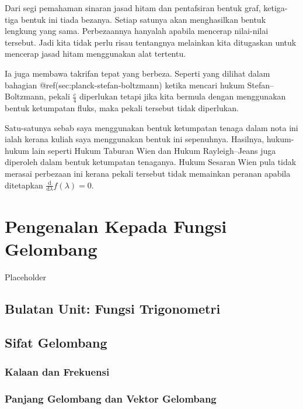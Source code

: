 \documentclass[
]{book}
\begin{document}
Dari segi pemahaman sinaran jasad hitam dan pentafsiran bentuk graf,
ketiga-tiga bentuk ini tiada bezanya. Setiap satunya akan menghasilkan
bentuk lengkung yang sama. Perbezaannya hanyalah apabila mencerap
nilai-nilai tersebut. Jadi kita tidak perlu risau tentangnya melainkan
kita ditugaskan untuk mencerap jasad hitam menggunakan alat tertentu.

Ia juga membawa takrifan tepat yang berbeza. Seperti yang dilihat dalam
bahagian @ref(sec:planck-stefan-boltzmann) ketika mencari hukum
Stefan--Boltzmann, pekali \(\frac{c}{4}\) diperlukan tetapi jika kita
bermula dengan menggunakan bentuk ketumpatan fluks, maka pekali tersebut
tidak diperlukan.

Satu-satunya sebab saya menggunakan bentuk ketumpatan tenaga dalam nota
ini ialah kerana kuliah saya menggunakan bentuk ini sepenuhnya.
Hasilnya, hukum-hukum lain seperti Hukum Taburan Wien dan Hukum
Rayleigh--Jeans juga diperoleh dalam bentuk ketumpatan tenaganya. Hukum
Sesaran Wien pula tidak merasai perbezaan ini kerana pekali tersebut
tidak memainkan peranan apabila ditetapkan
\(\frac{\text{d}}{\text{d}\lambda}f(\lambda) = 0\).

\hypertarget{pengenalan-kepada-fungsi-gelombang}{%
\chapter{Pengenalan Kepada Fungsi
Gelombang}\label{pengenalan-kepada-fungsi-gelombang}}

Placeholder

\hypertarget{bulatan-unit-fungsi-trigonometri}{%
\section{Bulatan Unit: Fungsi
Trigonometri}\label{bulatan-unit-fungsi-trigonometri}}

\hypertarget{sifat-gelombang}{%
\section{Sifat Gelombang}\label{sifat-gelombang}}

\hypertarget{kalaan-dan-frekuensi}{%
\subsection{Kalaan dan Frekuensi}\label{kalaan-dan-frekuensi}}

\hypertarget{panjang-gelombang-dan-vektor-gelombang}{%
\subsection{Panjang Gelombang dan Vektor
Gelombang}\label{panjang-gelombang-dan-vektor-gelombang}}
\end{document}
